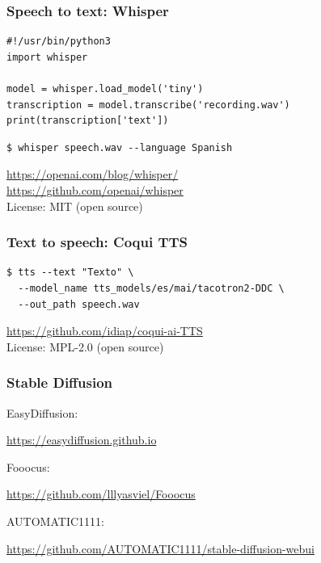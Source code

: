 \documentclass[17pt,aspectratio=169,hyperref={pdfusetitle,colorlinks,allcolors=olive}]{beamer}
\begin{document}
\begin{frame}[fragile]
  \frametitle{Speech to text: Whisper}

{\small
\begin{verbatim}
#!/usr/bin/python3
import whisper

model = whisper.load_model('tiny')
transcription = model.transcribe('recording.wav')
print(transcription['text'])
\end{verbatim}
}

\begin{verbatim}
$ whisper speech.wav --language Spanish
\end{verbatim}

\begin{flushright}
  {\scriptsize
    \url{https://openai.com/blog/whisper/} \\
    \url{https://github.com/openai/whisper} \\
    License: MIT (open source) \\
  }
\end{flushright}

\end{frame}

\begin{frame}[fragile]
  \frametitle{Text to speech: Coqui TTS}

{\small
\begin{verbatim}
$ tts --text "Texto" \
  --model_name tts_models/es/mai/tacotron2-DDC \
  --out_path speech.wav
\end{verbatim}
}

  \begin{flushright}
    {\small
    \url{https://github.com/idiap/coqui-ai-TTS} \\
    License: MPL-2.0 (open source) \\
  }
  \end{flushright}

\end{frame}


\begin{frame}[fragile]
\frametitle{Stable Diffusion}

EasyDiffusion:
\begin{flushright}
\url{https://easydiffusion.github.io}
\end{flushright}

Fooocus:
\begin{flushright}
\url{https://github.com/lllyasviel/Fooocus}
\end{flushright}

AUTOMATIC1111:
\begin{flushright}
\url{https://github.com/AUTOMATIC1111/stable-diffusion-webui}
\end{flushright}

\end{frame}
\end{document}
